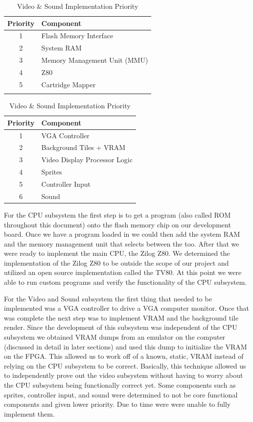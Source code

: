 \documentclass{article}
\begin{document}
\begin{table}[H]
    \parbox{.45\linewidth}{
    \begin{tabular}{cl}
        \toprule
        \textbf{Priority} & \textbf{Component} \\
        \midrule
        1 & Flash Memory Interface \\
        2 & System RAM \\
        3 & Memory Management Unit (MMU) \\
        4 & Z80 \\
        5 & Cartridge Mapper \\
          &\\
        \bottomrule
    \end{tabular}
    \caption{CPU \& Memory Implementation Priority}
}
\hfill
\parbox{.45\linewidth}{
    \begin{tabular}{cl}
        \toprule
        \textbf{Priority} & \textbf{Component} \\
        \midrule
        1 & VGA Controller \\
        2 & Background Tiles + VRAM \\
        3 & Video Display Processor Logic \\
        4 & Sprites \\
        5 & Controller Input \\
        6 & Sound \\
        \bottomrule
    \end{tabular}
    \caption{Video \& Sound Implementation Priority}
}
\end{table}

For the CPU subsystem the first step is to get a program (also called ROM
throughout this document) onto the flash memory chip on our development board.
Once we have a program loaded in we could then add the system RAM and the
memory management unit that selects between the too. After that we were ready
to implement the main CPU, the Zilog Z80. We determined the implementation of
the Zilog Z80 to be outside the scope of our project and utilized an open
source implementation called the TV80.  At this point we were able to run
custom programs and verify the functionality of the CPU subsystem.

For the Video and Sound subsystem the first thing that needed to be implemented
was a VGA controller to drive a VGA computer monitor. Once that was complete
the next step was to implement VRAM and the background tile render. Since the
development of this subsystem was independent of the CPU subsystem we obtained
VRAM dumps from an emulator on the computer (discussed in detail in later
sections) and used this dump to initialize the VRAM on the FPGA. This allowed
us to work off of a known, static, VRAM instead of relying on the CPU subsystem
to be correct. Basically, this technique allowed us to independently prove out
the video subsystem without having to worry about the CPU subsystem being
functionally correct yet. Some components such as sprites, controller input,
and sound were determined to not be core functional components and given lower
priority.  Due to time were were unable to fully implement them.
\end{document}
